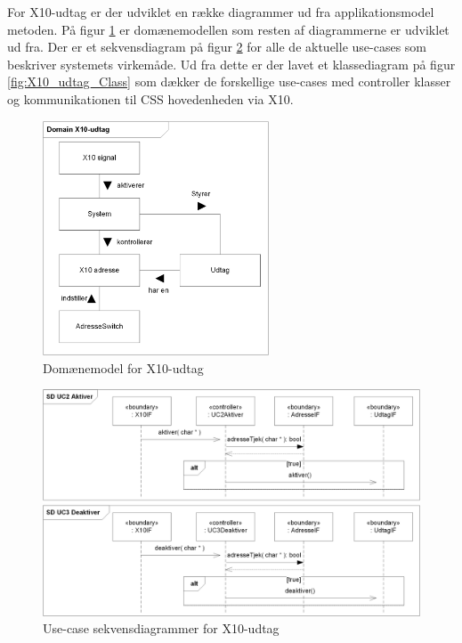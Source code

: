 For X10-udtag er der udviklet en række diagrammer ud fra applikationsmodel metoden.
På figur \ref{fig:X10_udtag_domain} er domænemodellen som resten af diagrammerne er udviklet ud fra.
Der er et sekvensdiagram på figur \ref{fig:X10_udtag_SD} for alle de aktuelle use-cases som beskriver systemets virkemåde.
Ud fra dette er der lavet et klassediagram på figur \ref{fig:X10_udtag_Class} som dækker de forskellige use-cases med controller klasser og kommunikationen til CSS hovedenheden via X10.


\begin{figure}[!htb] \centering
\centering \includegraphics[width=0.6\textwidth]{billeder/uml/X10_modtager_Domain}
     \caption{Domænemodel for X10-udtag}
     \label{fig:X10_udtag_domain}
\end{figure}

\begin{figure}[!htb]
	\includegraphics[width=\textwidth]{billeder/uml/X10_modtager_SD}
     \caption{Use-case sekvensdiagrammer for X10-udtag}
     \label{fig:X10_udtag_SD}
\end{figure}

